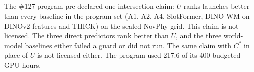 \subsection{\texorpdfstring{}{Program verdict}}
\label{sec:app:ext:verdict}

\begin{revblock}
\nopagebreak
The \#127 program pre-declared one intersection claim: $U$ ranks launches better than every baseline in the program set (A1, A2, A4, SlotFormer, DINO-WM on DINOv2 features and THICK) on the sealed NovPhy grid. This claim is not licensed. The three direct predictors rank better than $U$, and the three world-model baselines either failed a guard or did not run. The same claim with $C^{*}$ in place of $U$ is not licensed either. The program used 217.6 of its 400 budgeted GPU-hours.
\end{revblock}

